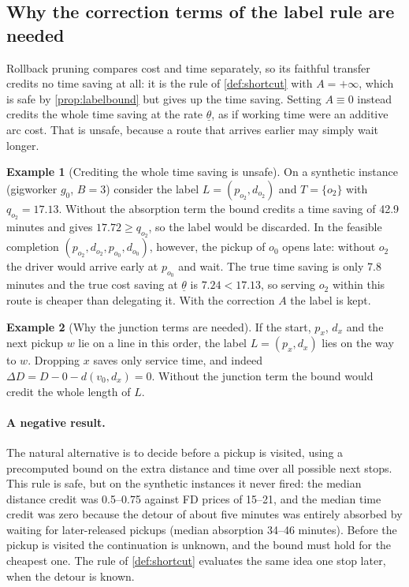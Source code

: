 \documentclass[11pt]{article}
\theoremstyle{definition}
\newtheorem{example}{Example}
\theoremstyle{remark}
\newcommand{\thl}{\underline{\theta}}
\begin{document}
\subsection{Why the correction terms of the label rule are needed}

Rollback pruning \citep{lozano2016exact} compares cost and time separately, so
its faithful transfer credits no time saving at all: it is the rule of
\cref{def:shortcut} with $A=+\infty$, which is safe by
\cref{prop:labelbound} but gives up the time saving. Setting $A\equiv0$ instead
credits the whole time saving at the rate $\thl$, as if working time were an
additive arc cost. That is unsafe, because a route that arrives earlier may
simply wait longer.

\begin{example}[Crediting the whole time saving is unsafe]\label{ex:rollback}
On a synthetic instance (gigworker $g_0$, $B=3$) consider the label
$L=(p_{o_2},d_{o_2})$ and $T=\{o_2\}$ with $q_{o_2}=17.13$. Without the absorption
term the bound credits a time saving of 42.9 minutes and gives
$17.72\ge q_{o_2}$, so the label would be discarded. In the feasible completion
$(p_{o_2},d_{o_2},p_{o_0},d_{o_0})$, however, the pickup of $o_0$ opens late:
without $o_2$ the driver would arrive early at $p_{o_0}$ and wait. The true time
saving is only 7.8 minutes and the true cost saving at $\thl$ is
$7.24<17.13$, so serving $o_2$ within this route is cheaper than delegating it.
With the correction $A$ the label is kept.
\end{example}

\begin{example}[Why the junction terms are needed]
If the start, $p_x$, $d_x$ and the next pickup $w$ lie on a line in this order,
the label $L=(p_x,d_x)$ lies on the way to $w$. Dropping $x$ saves only service
time, and indeed $\Delta D=D-0-d(v_0,d_x)=0$. Without the junction term the
bound would credit the whole length of $L$.
\end{example}

\paragraph{A negative result.} The natural alternative is to decide before a
pickup is visited, using a precomputed bound on the extra distance and time
over all possible next stops. This rule is safe, but on the synthetic instances
it never fired: the median distance credit was 0.5--0.75 against FD prices of
15--21, and the median time credit was zero because the detour of about five
minutes was entirely absorbed by waiting for later-released pickups (median
absorption 34--46 minutes). Before the pickup is visited the continuation is
unknown, and the bound must hold for the cheapest one. The rule of
\cref{def:shortcut} evaluates the same idea one stop later, when the detour is
known.
\end{document}
